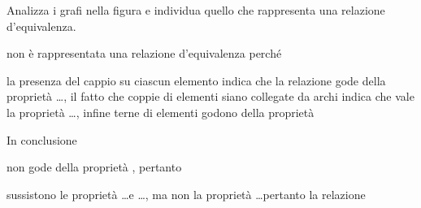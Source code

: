 \begin{esercizio}
\label{ese:B.31}
Analizza i grafi nella figura e individua quello che 
rappresenta una relazione d'equivalenza.

\begin{center}
\begin{inaccessibleblock}
 
\end{inaccessibleblock}
\end{center}

\begin{description} [nosep]
\item [caso~1] non è rappresentata una relazione d'equivalenza perché 
 \dotfill
\item [caso~2] la presenza del cappio su ciascun elemento indica che la 
relazione gode della proprietà \ldots,
il fatto che coppie di elementi siano collegate da archi indica che vale la 
proprietà \ldots, infine terne di elementi godono della proprietà \dotfill

In conclusione \dotfill
\item [caso~3] non gode della proprietà \dotfill, 
pertanto \dotfill
\item [caso~4] sussistono le proprietà \ldots e \ldots, ma non la proprietà 
\ldots pertanto la relazione \dotfill
\end{description}
\end{esercizio}

